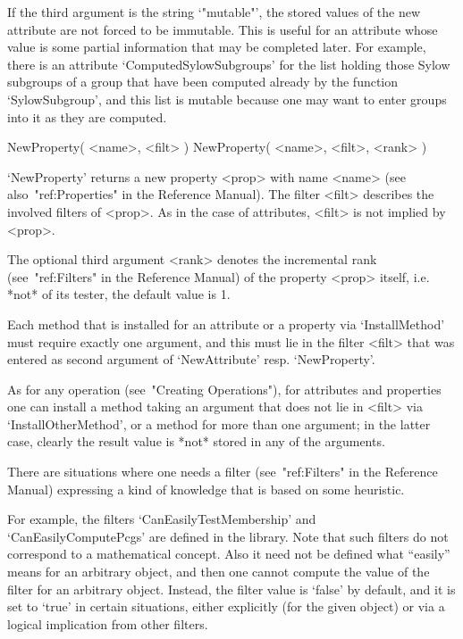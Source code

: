 If the third argument is the string `"mutable"', the stored values of the
new attribute are not forced to be immutable.
This is useful for an attribute whose value is some partial information
that may be completed later.
For example, there is an attribute `ComputedSylowSubgroups' for the list
holding those Sylow subgroups of a group that have been computed already
by the function `SylowSubgroup',
and this list is mutable because one may want to enter groups into it
as they are computed.

\>NewProperty( <name>, <filt> )
\)NewProperty( <name>, <filt>, <rank> )

`NewProperty' returns a new property <prop> with name <name>
(see also~"ref:Properties" in the Reference Manual).
The filter <filt> describes the involved filters of <prop>.
As in the case of attributes, <filt> is not implied by <prop>.

The optional third argument <rank> denotes the incremental rank
(see~"ref:Filters" in the Reference Manual) of the property <prop> itself,
i.e. *not* of its tester, the default value is 1.

Each method that is installed for an attribute or a property
via `InstallMethod' must require exactly one argument,
and this must lie in the filter <filt> that was entered as second
argument of `NewAttribute' resp. `NewProperty'.

As for any operation (see~"Creating Operations"),
for attributes and properties one can install a method taking an argument
that does not lie in <filt> via `InstallOtherMethod',
or a method for more than one argument;
in the latter case,
clearly the result value is *not* stored in any of the arguments.



There are situations where one needs a filter
(see~"ref:Filters" in the Reference Manual) expressing a kind of
knowledge that is based on some heuristic.

For example, the filters `CanEasilyTestMembership' and
`CanEasilyComputePcgs' are defined in the {\GAP} library.
Note that such filters do not correspond to a mathematical concept.
Also it need not be defined what ``easily'' means for an arbitrary {\GAP}
object, and then one cannot compute the value of the filter for an
arbitrary {\GAP} object.
Instead, the filter value is `false' by default,
and it is set to `true' in certain situations,
either explicitly (for the given object) or via a logical implication
from other filters.

